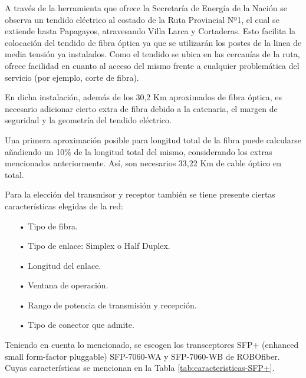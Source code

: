 A través de la herramienta que ofrece la Secretaría de Energía de la Nación se observa un tendido eléctrico al costado de la Ruta Provincial Nº1, el cual se extiende hasta Papagayos, atravesando Villa Larca y Cortaderas. Esto facilita la colocación del tendido de fibra óptica ya que se utilizarán los postes de la linea de media tensión ya instalados.
Como el tendido se ubica en las cercanías de la ruta, ofrece facilidad en cuanto al acceso del mismo frente a cualquier problemática del servicio (por ejemplo, corte de fibra).



En dicha instalación, además de los 30,2 Km aproximados de fibra óptica, es necesario adicionar cierto extra de fibra debido a la catenaria, el margen de seguridad y la geometría del tendido eléctrico.

Una primera aproximación posible para longitud total de la fibra puede calcularse añadiendo un 10\% de la longitud total del mismo, considerando los extras mencionados anteriormente. Así, son necesarios 33,22 Km de cable óptico en total.





Para la elección del transmisor y receptor también se tiene presente ciertas características elegidas de la red:

\begin{enumerate}
\item[•]Tipo de fibra.
\item[•]Tipo de enlace: Simplex o Half Duplex.
\item[•]Longitud del enlace.
\item[•]Ventana de operación.
\item[•]Rango de potencia de transmisión y recepción.
\item[•]Tipo de conector que admite.
\end{enumerate}


Teniendo en cuenta lo mencionado, se escogen los transceptores SFP+ (enhanced small form-factor pluggable) SFP-7060-WA y SFP-7060-WB de ROBOfiber. Cuyas características se mencionan en la Tabla \ref{tab:caracteristicas-SFP+}.




